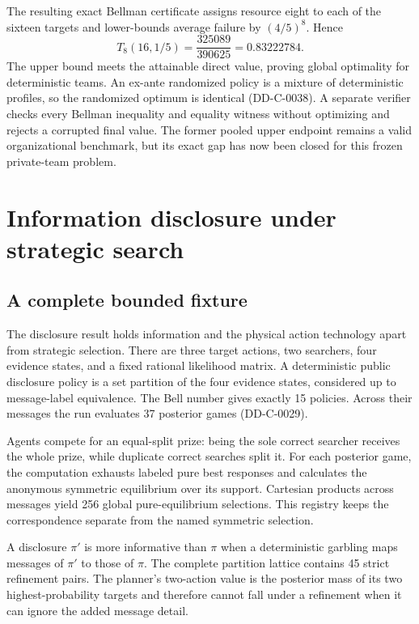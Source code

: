 \documentclass[11pt]{article}
\theoremstyle{remark}
\begin{document}
The resulting exact Bellman certificate assigns resource eight to each of the
sixteen targets and lower-bounds average failure by $(4/5)^8$. Hence
\[
\boxed{T_8(16,1/5)=\frac{325089}{390625}=0.83222784.}
\]
The upper bound meets the attainable direct value, proving global optimality for
deterministic teams. An ex-ante randomized policy is a mixture of deterministic
profiles, so the randomized optimum is identical (DD-C-0038). A separate verifier
checks every Bellman inequality and equality witness without optimizing and
rejects a corrupted final value. The former pooled upper endpoint remains a valid
organizational benchmark, but its exact gap has now been closed for this frozen
private-team problem.

\section{Information disclosure under strategic search}
\subsection{A complete bounded fixture}

The disclosure result holds information and the physical action technology apart
from strategic selection. There are three target actions, two searchers, four
evidence states, and a fixed rational likelihood matrix. A deterministic public
disclosure policy is a set partition of the four evidence states, considered up
to message-label equivalence. The Bell number gives exactly 15 policies. Across
their messages the run evaluates 37 posterior games (DD-C-0029).

Agents compete for an equal-split prize: being the sole correct searcher receives
the whole prize, while duplicate correct searches split it. For each posterior
game, the computation exhausts labeled pure best responses and calculates the
anonymous symmetric equilibrium over its support. Cartesian products across
messages yield 256 global pure-equilibrium selections. This registry keeps the
correspondence separate from the named symmetric selection.

A disclosure $\pi'$ is more informative than $\pi$ when a deterministic garbling
maps messages of $\pi'$ to those of $\pi$. The complete partition lattice contains
45 strict refinement pairs. The planner's two-action value is the posterior mass
of its two highest-probability targets and therefore cannot fall under a refinement
when it can ignore the added message detail.
\end{document}
